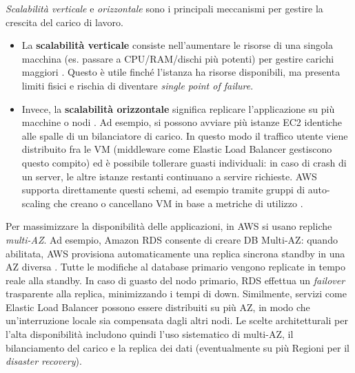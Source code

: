 \documentclass[a4paper,12pt]{report}
\begin{document}
\textit{Scalabilità verticale} e \textit{orizzontale} sono i principali meccanismi per gestire la crescita del carico di lavoro.
\begin{itemize}
    \item La \textbf{scalabilità verticale} consiste nell’aumentare le risorse di una singola macchina (es. passare a CPU/RAM/dischi più potenti) per gestire carichi maggiori \cite{digitalocean-cloud}. Questo è utile finché l’istanza ha risorse disponibili, ma presenta limiti fisici e rischia di diventare \textit{single point of failure}.
    \item Invece, la \textbf{scalabilità orizzontale} significa replicare l’applicazione su più macchine o nodi \cite{digitalocean-cloud}. Ad esempio, si possono avviare più istanze EC2 identiche alle spalle di un bilanciatore di carico. In questo modo il traffico utente viene distribuito fra le VM (middleware come Elastic Load Balancer gestiscono questo compito) ed è possibile tollerare guasti individuali: in caso di crash di un server, le altre istanze restanti continuano a servire richieste. AWS supporta direttamente questi schemi, ad esempio tramite gruppi di auto-scaling che creano o cancellano VM in base a metriche di utilizzo \cite{aws-scaling}.
\end{itemize}

Per massimizzare la disponibilità delle applicazioni, in AWS si usano repliche \textit{multi-AZ}. Ad esempio, Amazon RDS consente di creare DB Multi-AZ: quando abilitata, AWS provisiona automaticamente una replica sincrona standby in una AZ diversa \cite{aws-rds-multiaz}. Tutte le modifiche al database primario vengono replicate in tempo reale alla standby. In caso di guasto del nodo primario, RDS effettua un \textit{failover} trasparente alla replica, minimizzando i tempi di down. Similmente, servizi come Elastic Load Balancer possono essere distribuiti su più AZ, in modo che un’interruzione locale sia compensata dagli altri nodi. Le scelte architetturali per l’alta disponibilità includono quindi l’uso sistematico di multi-AZ, il bilanciamento del carico e la replica dei dati (eventualmente su più Regioni per il \textit{disaster recovery}).
\end{document}
